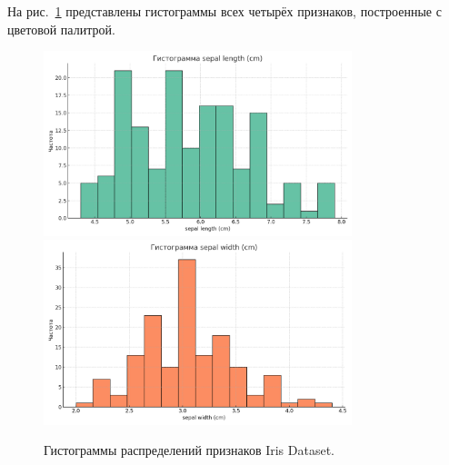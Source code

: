 На рис.~\ref{fig:iris_histos} представлены гистограммы всех четырёх признаков, построенные с цветовой палитрой.
\begin{figure}[H]
  \centering
  \includegraphics[width=0.8\textwidth]{images/histo_sepal_length_cm_cb2.png}\\[6pt]
  \includegraphics[width=0.8\textwidth]{images/histo_sepal_width_cm_cb2.png}
  \caption{Гистограммы распределений признаков Iris Dataset.}
  \label{fig:iris_histos}
\end{figure}

